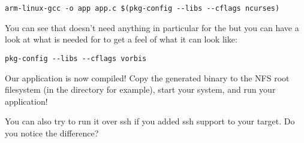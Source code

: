 \begin{verbatim}
arm-linux-gcc -o app app.c $(pkg-config --libs --cflags ncurses)
\end{verbatim}

You can see that  doesn't need anything in particular for the
 but you can have a look at what is needed for
 to get a feel of what it can look like:

\begin{verbatim}
pkg-config --libs --cflags vorbis
\end{verbatim}

Our application is now compiled! Copy the generated binary to the NFS
root filesystem (in the  directory for example), start
your system, and run your application!

You can also try to run it over ssh if you added ssh support to your
target. Do you notice the difference?
